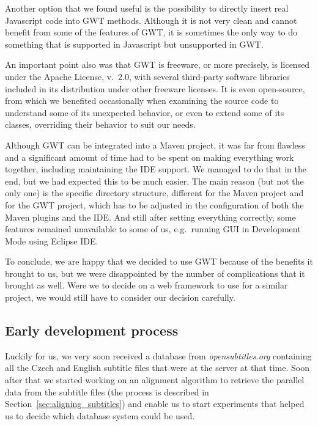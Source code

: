 Another option that we found useful is the possibility to directly insert real Javascript code into GWT methods. Although it is not very clean and cannot benefit from some of the features of GWT, it is sometimes the only way to do something that is supported in Javascript but unsupported in GWT.

An important point also was that GWT is freeware, or more precisely, is licensed under the Apache License, v.~2.0, with several third-party software libraries included in its distribution under other freeware licenses. It is even open-source, from which we benefited occasionally when examining the source code to understand some of its unexpected behavior, or even to extend some of its classes, overriding their behavior to suit our needs.

Although GWT can be integrated into a Maven project, it was far from flawless and a significant amount of time had to be spent on making everything work together, including maintaining the IDE support. We managed to do that in the end, but we had expected this to be much easier. The main reason (but not the only one) is the specific directory structure, different for the Maven project and for the GWT project, which has to be adjusted in the configuration of both the Maven plugins and the IDE.
And still after setting everything correctly, some features remained unavailable to some of us, e.g.\ running GUI in Development Mode using Eclipse IDE.

To conclude, we are happy that we decided to use GWT because of the benefits it brought to us, but we were disappointed by the number of complications that it brought as well. Were we to decide on a web framework to use for a similar project, we would still have to consider our decision carefully.

\subsection{Early development process}

Luckily for us, we very soon received a database from {\it opensubtitles.org} containing all the Czech and English subtitle files that were at the server at that time. Soon after that we started working on an alignment algorithm to retrieve the parallel data from the subtitle files (the process is described in Section~\ref{sec:aligning_subtitles}) and enable us to start experiments that helped us to decide which database system could be used.

